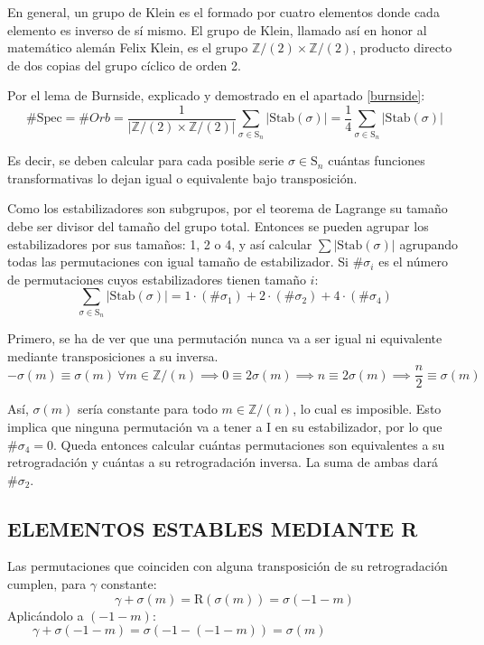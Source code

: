 		En general, un grupo de Klein es el formado por cuatro elementos donde cada elemento es inverso de sí mismo. El grupo de Klein, llamado así en honor al matemático alemán Felix Klein, es el grupo $\mathbb{Z}/(2)\times\mathbb{Z}/(2)$, producto directo de dos copias del grupo cíclico de orden 2.
		
		Por el lema de Burnside, explicado y demostrado en el apartado \ref{burnside}:	
		$$\#\text{Spec}=\#Orb=\frac{1}{|\mathbb{Z}/(2)\times\mathbb{Z}/(2)|}\sum_{\sigma\in\text{S}_n}|\text{Stab}(\sigma)|=\frac{1}{4}\sum_{\sigma\in\text{S}_n}|\text{Stab}(\sigma)|$$
		
		Es decir, se deben calcular para cada posible serie $\sigma\in\text{S}_n$ cuántas funciones transformativas lo dejan igual o equivalente bajo transposición.
		
		Como los estabilizadores son subgrupos, por el teorema de Lagrange su tamaño debe ser divisor del tamaño del grupo total. Entonces se pueden agrupar los estabilizadores por sus tamaños: 1, 2 o 4, y así calcular $\sum|\text{Stab}(\sigma)|$ agrupando todas las permutaciones con igual tamaño de estabilizador. Si $\#\sigma_i$ es el número de permutaciones cuyos estabilizadores tienen tamaño $i$:		
		$$\sum_{\sigma\in\text{S}_n}|\text{Stab}(\sigma)|=1\cdot(\#\sigma_1)+2\cdot(\#\sigma_2)+4\cdot(\#\sigma_4)$$
	
		Primero, se ha de ver que una permutación nunca va a ser igual ni equivalente mediante transposiciones a su inversa.	\label{inversano}	
		$$-\sigma(m)\equiv\sigma(m)\ \forall m\in \mathbb{Z} / (n) \implies 0\equiv2\sigma(m)\implies n\equiv2\sigma(m) \implies \frac{n}{2}\equiv\sigma(m)$$
		
		Así, $\sigma(m)$ sería constante para todo $m\in \mathbb{Z} / (n)$, lo cual es imposible. Esto implica que ninguna permutación va a tener a I en su estabilizador, por lo que $\#\sigma_4=0$. Queda entonces calcular cuántas permutaciones son equivalentes a su retrogradación y cuántas a su retrogradación inversa. La suma de ambas dará $\#\sigma_2$.
	
	\subsection{ELEMENTOS ESTABLES MEDIANTE R}
		Las permutaciones que coinciden con alguna transposición de su retrogradación cumplen, para $\gamma$ constante:
		$$\gamma+\sigma(m)=\text{R}(\sigma(m))=\sigma(-1-m)$$
		Aplicándolo a $(-1-m)$: $\qquad\gamma+\sigma(-1-m)=\sigma(-1-(-1-m))=\sigma(m)$
		
